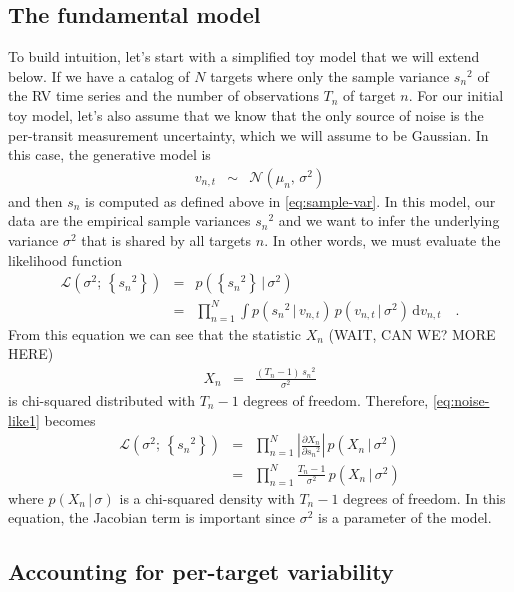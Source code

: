 \documentclass[modern, letterpaper]{aastex631}
\newcommand{\dd}{\ensuremath{\,\mathrm{d}}}
\begin{document}
\subsection{The fundamental model}

To build intuition, let's start with a simplified toy model that we will extend below.
If we have a catalog of $N$ targets where only the sample variance ${s_n}^2$ of the RV time series and the number of observations $T_n$ of target $n$.
For our initial toy model, let's also assume that we know that the only source of noise is the per-transit measurement uncertainty, which we will assume to be Gaussian.
In this case, the generative model is
\begin{eqnarray}
	v_{n,t} &\sim& \mathcal{N}(\mu_n,\,\sigma^2)
\end{eqnarray}
and then $s_n$ is computed as defined above in \autoref{eq:sample-var}.
In this model, our data are the empirical sample variances ${s_n}^2$ and we want to infer the underlying variance $\sigma^2$ that is shared by all targets $n$.
In other words, we must evaluate the likelihood function
\begin{eqnarray}
	\label{eq:noise-like1}
	\mathcal{L}(\sigma^2;\,\left\{{s_n}^2\right\}) &=& p(\left\{{s_n}^2\right\}\,|\,\sigma^2) \\
	&=& \prod_{n=1}^N\int p({s_n}^2\,|\,v_{n,t})\,p(v_{n,t}\,|\,\sigma^2) \dd v_{n,t}\quad.
\end{eqnarray}
From this equation we can see that the statistic $X_n$ (WAIT, CAN WE? MORE HERE)
\begin{eqnarray}
	X_n &=& \frac{(T_n - 1)\,{s_n}^2}{\sigma^2}
\end{eqnarray}
is chi-squared distributed with $T_n - 1$ degrees of freedom.
Therefore, \autoref{eq:noise-like1} becomes
\begin{eqnarray}
	\label{eq:noise-like2}
	\mathcal{L}(\sigma^2;\,\left\{{s_n}^2\right\}) &=& \prod_{n=1}^N \left|\frac{\partial X_n}{\partial {s_n}^2}\right|\,p(X_n\,|\,\sigma^2) \nonumber\\
	&=& \prod_{n=1}^N \frac{T_n - 1}{\sigma^2}\,p(X_n\,|\,\sigma^2)
\end{eqnarray}
where $p(X_n\,|\,\sigma)$ is a chi-squared density with $T_n - 1$ degrees of freedom.
In this equation, the Jacobian term is important since $\sigma^2$ is a parameter of the model.

\subsection{Accounting for per-target variability}
\end{document}
